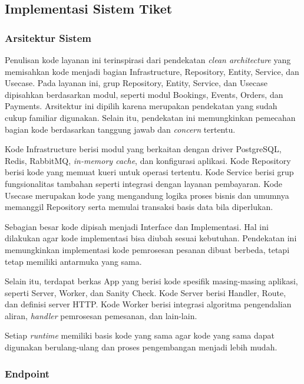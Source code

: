\subsection{Implementasi Sistem Tiket}

\subsubsection{Arsitektur Sistem}

Penulisan kode layanan ini terinspirasi dari pendekatan \textit{clean architecture} yang memisahkan kode menjadi bagian Infrastructure, Repository, Entity, Service, dan Usecase. Pada layanan ini, grup Repository, Entity, Service, dan Usecase dipisahkan berdasarkan modul, seperti modul Bookings, Events, Orders, dan Payments. Arsitektur ini dipilih karena merupakan pendekatan yang sudah cukup familiar digunakan. Selain itu, pendekatan ini memungkinkan pemecahan bagian kode berdasarkan tanggung jawab dan \textit{concern} tertentu.

Kode Infrastructure berisi modul yang berkaitan dengan driver PostgreSQL, Redis, RabbitMQ, \textit{in-memory cache}, dan konfigurasi aplikasi. Kode Repository berisi kode yang memuat kueri untuk operasi tertentu. Kode Service berisi grup fungsionalitas tambahan seperti integrasi dengan layanan pembayaran. Kode Usecase merupakan kode yang mengandung logika proses bisnis dan umumnya memanggil Repository serta memulai transaksi basis data bila diperlukan.

Sebagian besar kode dipisah menjadi Interface dan Implementasi. Hal ini dilakukan agar kode implementasi bisa diubah sesuai kebutuhan. Pendekatan ini memungkinkan implementasi kode pemrosesan pesanan dibuat berbeda, tetapi tetap memiliki antarmuka yang sama.

Selain itu, terdapat berkas App yang berisi kode spesifik masing-masing aplikasi, seperti Server, Worker, dan Sanity Check. Kode Server berisi Handler, Route, dan definisi server HTTP. Kode Worker berisi integrasi algoritma pengendalian aliran, \textit{handler} pemrosesan pemesanan, dan lain-lain.

Setiap \textit{runtime} memiliki basis kode yang sama agar kode yang sama dapat digunakan berulang-ulang dan proses pengembangan menjadi lebih mudah.

\subsubsection{Endpoint}

